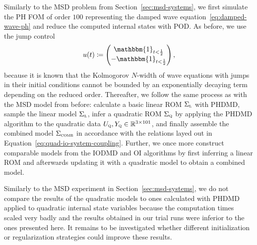 Similarly to the \ac{MSD} problem from Section~\eqref{sec:msd-systems}, we first simulate the \ac{PH} \ac{FOM} of order $100$ representing the damped wave equation~\ref{eq:damped-wave-ph} and reduce the computed internal states with \ac{POD}.
As before, we use the jump control
\begin{equation*}
    u(t) \coloneqq \begin{pmatrix}
        \mathbbm{1}_{t < \frac{1}{2}} \\
        - \mathbbm{1}_{t < \frac{1}{2}}
    \end{pmatrix},
\end{equation*}
because it is known that the Kolmogorov $N$-width of wave equations with jumps in their initial conditions cannot be bounded by an exponentially decaying term depending on the reduced order.
Thereafter, we follow the same process as with the \ac{MSD} model from before: calculate a basic linear \ac{ROM} $\Sigma_{\textnormal{\scshape l}}$ with \ac{PHDMD}, sample the linear model $\Sigma_{\textnormal{\scshape l}}$, infer a quadratic \ac{ROM} $\Sigma_{\textnormal{\scshape q}}$ by applying the \ac{PHDMD} algorithm to the quadratic data $U_{\textnormal{\scshape q}}, Y_{\textnormal{\scshape q}} \in \mathbb{R}^{3 \times 101}$, and finally assemble the combined model $\Sigma_{\textnormal{\scshape comb}}$ in accordance with the relations layed out in Equation~\eqref{eq:quad-io-system-coupling}.
Further, we once more construct comparable models from the \ac{IODMD} and \ac{OI} algorithms by first inferring a linear \ac{ROM} and afterwards updating it with a quadratic model to obtain a combined model.





Similarly to the \ac{MSD} experiment in Section~\ref{sec:msd-systems}, we do not compare the results of the quadratic models to ones calculated with \ac{PHDMD} applied to quadratic internal state variables because the computation times scaled very badly and the results obtained in our trial runs were inferior to the ones presented here.
It remains to be investigated whether different initialization or regularization strategies could improve these results.
